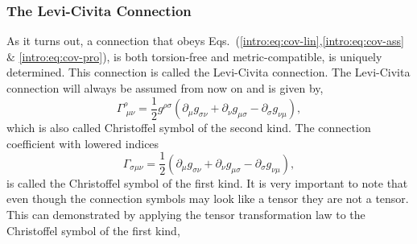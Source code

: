 \subsubsection{The Levi-Civita Connection}
As it turns out, a connection that obeys Eqs.~(\ref{intro:eq:cov-lin},\ref{intro:eq:cov-ass} $\&$ \ref{intro:eq:cov-pro}), is both torsion-free and metric-compatible, is uniquely determined. This connection is called the Levi-Civita connection. The Levi-Civita connection will always be assumed from now on and is given by,
\begin{equation} \label{intro:eq:christoffel_def}
\Gamma^\rho_{\,\,\mu\nu} = \frac{1}{2}g^{\rho\sigma} ( \partial_{\mu} g_{\sigma\nu} + \partial_{\nu} g_{\mu\sigma} - \partial_{\sigma} g_{\nu\mu} ),
\end{equation}
which is also called Christoffel symbol of the second kind. The connection coefficient with lowered indices
\begin{equation}
\Gamma_{\sigma\mu\nu} = \frac{1}{2}( \partial_{\mu} g_{\sigma\nu} + \partial_{\nu} g_{\mu\sigma} - \partial_{\sigma} g_{\nu\mu} ),
\end{equation}
is called the Christoffel symbol of the first kind. It is very important to note that even though the connection symbols may look like a tensor they are not a tensor. This can demonstrated by applying the tensor transformation law to the Christoffel symbol of the first kind,
